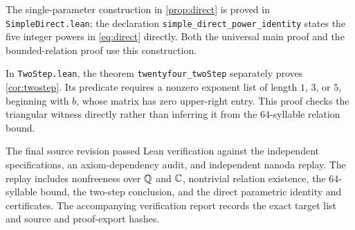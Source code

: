 The single-parameter construction in \cref{prop:direct} is proved in
\texttt{SimpleDirect.lean}; the declaration
\texttt{simple\_direct\_power\_identity} states the five integer powers
in \eqref{eq:direct} directly. Both the universal main proof and the
bounded-relation proof use this construction.

In \texttt{TwoStep.lean}, the theorem \texttt{twentyfour\_twoStep}
separately proves \cref{cor:twostep}. Its predicate requires a
nonzero exponent list of length $1$, $3$, or $5$, beginning with $b$,
whose matrix has zero upper-right entry. This proof checks the
triangular witness directly rather than inferring it from the
$64$-syllable relation bound.

The final source revision passed Lean verification against the
independent specifications, an axiom-dependency audit, and independent
nanoda replay. The replay includes nonfreeness over $\mathbb Q$ and $\mathbb C$,
nontrivial relation existence, the $64$-syllable bound, the two-step
conclusion, and the direct parametric identity and certificates.
The accompanying verification report records the exact target list
and source and proof-export hashes.

